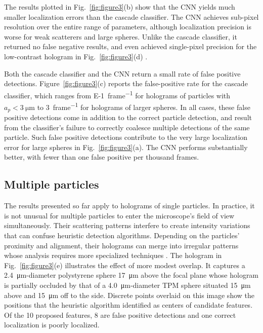 The results plotted in Fig.~\ref{fig:figure3}(b) show that
the CNN yields much smaller
localization errors than the cascade classifier.
The CNN achieves sub-pixel
resolution over the entire range of parameters,
although localization precision is worse for
weak scatterers and large spheres.
Unlike the cascade classifier, it returned no
false negative results, and even achieved single-pixel
precision for the low-contrast hologram in
Fig.~\ref{fig:figure3}(d) \cite{hannel18}.

Both the cascade classifier and the CNN
return a small rate of false positive detections.
Figure~\ref{fig:figure3}(c) reports the false-positive
rate for the cascade classifier, which ranges from
\SI{E-1}{frame^{-1}} for holograms of particles with
$a_p < \SI{3}{\um}$
to \SI{3}{frame^{-1}} for holograms of larger spheres.
In all cases, these false positive detections come in addition
to the correct particle detection, and result from
the classifier's failure to correctly coalesce multiple detections
of the same particle.
Such false positive detections contribute to the very large
localization error for large spheres in Fig.~\ref{fig:figure3}(a).
The CNN performs substantially
better, with fewer than one false positive per thousand
frames.

\subsection{Multiple particles}

The results presented so far apply to holograms of single
particles.
In practice, it is not unusual for multiple particles to enter 
the microscope's field of view simultaneously.
Their scattering patterns interfere to create
intensity variations that can confuse heuristic detection algorithms.
Depending on the particles' proximity and alignment, their
holograms can merge into irregular patterns whose analysis
requires more specialized techniques \cite{perry12,fung13}.
The hologram in Fig.~\ref{fig:figure3}(e)
illustrates the effect of more modest overlap.
It captures a \SI{2.4}{\um}-diameter
polystyrene sphere \SI{17}{\um} above the focal plane
whose hologram is partially occluded by that 
of a \SI{4.0}{\um}-diameter TPM sphere situated \SI{15}{\um}
above and \SI{15}{\um} off to the side.
Discrete points overlaid on this image show the
positions that the heuristic algorithm
identified as centers of candidate features.
Of the 10 proposed features, 8 are false positive detections
and one correct localization is poorly localized.

